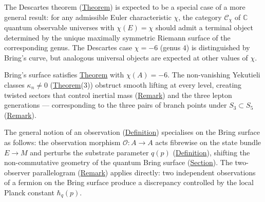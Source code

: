 \begin{remark}
  \label{rem:universality-general}
The Descartes theorem (\hyperref[thm:descartes]{Theorem}) is expected to be a
special case of a more general result: for any admissible Euler
characteristic $\chi$, the category $\mathcal{C}_{\chi}$ of $\mathbb{C}$
quantum observable universes with $\chi(E) = \chi$ should admit a terminal
object determined by the unique maximally symmetric Riemann surface of the
corresponding genus.  The Descartes case $\chi = -6$ (genus $4$) is
distinguished by Bring's curve, but analogous universal objects are expected
at other values of $\chi$.
\end{remark}

\begin{example}
  \label{ex:descartes-yekutieli}
Bring's surface satisfies \hyperref[thm:qu-to-qou]{Theorem} with
$\chi(A) = -6$.  The non-vanishing Yekutieli classes $\kappa_n \neq 0$
(\hyperref[thm:qu-to-qou]{Theorem}(3)) obstruct smooth lifting at every level,
creating twisted sectors that control inertial mass
(\hyperref[rem:mass-geometric-drag]{Remark}) and the three lepton generations
--- corresponding to the three pairs of branch points under
$S_3 \subset S_5$ (\hyperref[rem:chirality-trefoil]{Remark}).
\end{example}

\begin{remark}
  \label{rem:observation-brings}
The general notion of an observation
(\hyperref[def:observation]{Definition}) specialises on the Bring surface as
follows: the observation morphism $\mathcal{O} \colon A \to A$ acts
fibrewise on the state bundle $E \to M$ and perturbs the substrate
parameter $q(p)$ (\hyperref[def:substrate-parameter]{Definition}), shifting
the non-commutative geometry of the quantum Bring surface
(\hyperref[sec:quantum-brings]{Section}).  The two-observer parallelogram
(\hyperref[rem:two-observer-parallelogram]{Remark}) applies directly: two
independent observations of a fermion on the Bring surface produce a
discrepancy controlled by the local Planck constant $\hbar_q(p)$.
\end{remark}
